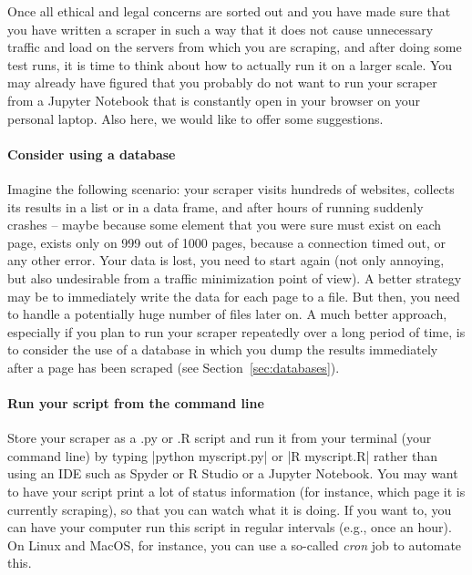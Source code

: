 Once all ethical and legal concerns are sorted out and you have made sure that you have written a scraper in such a way that it does not cause unnecessary traffic and load on the servers from which you are scraping, and after doing some test runs, it is time to think about how to actually run it on a larger scale. You may already have figured that you probably do not want to run your scraper from a Jupyter Notebook that is constantly open in your browser on your personal laptop. Also here, we would like to offer some suggestions.

\paragraph{Consider using a database} Imagine the following scenario: your scraper visits hundreds of websites, collects its results in a list or in a data frame, and after hours of running suddenly crashes -- maybe because some element that you were sure must exist on each page,  exists only on 999 out of 1000 pages, because a connection timed out, or any other error. Your data is lost, you need to start again (not only annoying, but also undesirable from a traffic minimization point of view). A better strategy may be to immediately write the data for each page  to a file. But then, you need to handle a potentially huge number of files later on. A much better approach, especially if you plan to run your scraper repeatedly over a long period of time, is to consider the use of a database in which you dump the results immediately after a page has been scraped (see Section~\ref{sec:databases}).

\paragraph{Run your script from the command line} Store your scraper as a .py or .R script and run it from your terminal (your command line) by typing |python myscript.py| or |R myscript.R| rather than using an IDE such as Spyder or R Studio or a Jupyter Notebook. You may want to have your script print a lot of status information (for instance, which page it is currently scraping), so that you can watch what it is doing. If you want to, you can have your computer run this script in regular intervals (e.g., once an hour). On Linux and MacOS, for instance, you can use a so-called \emph{cron} job to automate this.

